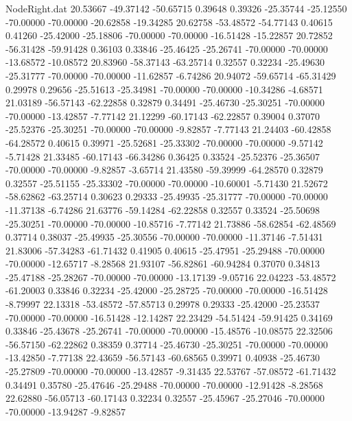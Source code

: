 \begin{filecontents}{NodeRight.dat}
  20.53667  -49.37142  -50.65715     0.39648    0.39326  -25.35744  -25.12550  -70.00000  -70.00000  -20.62858  -19.34285
  20.62758  -53.48572  -54.77143     0.40615    0.41260  -25.42000  -25.18806  -70.00000  -70.00000  -16.51428  -15.22857
  20.72852  -56.31428  -59.91428     0.36103    0.33846  -25.46425  -25.26741  -70.00000  -70.00000  -13.68572  -10.08572
  20.83960  -58.37143  -63.25714     0.32557    0.32234  -25.49630  -25.31777  -70.00000  -70.00000  -11.62857   -6.74286
  20.94072  -59.65714  -65.31429     0.29978    0.29656  -25.51613  -25.34981  -70.00000  -70.00000  -10.34286   -4.68571
  21.03189  -56.57143  -62.22858     0.32879    0.34491  -25.46730  -25.30251  -70.00000  -70.00000  -13.42857   -7.77142
  21.12299  -60.17143  -62.22857     0.39004    0.37070  -25.52376  -25.30251  -70.00000  -70.00000   -9.82857   -7.77143
  21.24403  -60.42858  -64.28572     0.40615    0.39971  -25.52681  -25.33302  -70.00000  -70.00000   -9.57142   -5.71428
  21.33485  -60.17143  -66.34286     0.36425    0.33524  -25.52376  -25.36507  -70.00000  -70.00000   -9.82857   -3.65714
  21.43580  -59.39999  -64.28570     0.32879    0.32557  -25.51155  -25.33302  -70.00000  -70.00000  -10.60001   -5.71430
  21.52672  -58.62862  -63.25714     0.30623    0.29333  -25.49935  -25.31777  -70.00000  -70.00000  -11.37138   -6.74286
  21.63776  -59.14284  -62.22858     0.32557    0.33524  -25.50698  -25.30251  -70.00000  -70.00000  -10.85716   -7.77142
  21.73886  -58.62854  -62.48569     0.37714    0.38037  -25.49935  -25.30556  -70.00000  -70.00000  -11.37146   -7.51431
  21.83006  -57.34283  -61.71432     0.41905    0.40615  -25.47951  -25.29488  -70.00000  -70.00000  -12.65717   -8.28568
  21.93107  -56.82861  -60.94284     0.37070    0.34813  -25.47188  -25.28267  -70.00000  -70.00000  -13.17139   -9.05716
  22.04223  -53.48572  -61.20003     0.33846    0.32234  -25.42000  -25.28725  -70.00000  -70.00000  -16.51428   -8.79997
  22.13318  -53.48572  -57.85713     0.29978    0.29333  -25.42000  -25.23537  -70.00000  -70.00000  -16.51428  -12.14287
  22.23429  -54.51424  -59.91425     0.34169    0.33846  -25.43678  -25.26741  -70.00000  -70.00000  -15.48576  -10.08575
  22.32506  -56.57150  -62.22862     0.38359    0.37714  -25.46730  -25.30251  -70.00000  -70.00000  -13.42850   -7.77138
  22.43659  -56.57143  -60.68565     0.39971    0.40938  -25.46730  -25.27809  -70.00000  -70.00000  -13.42857   -9.31435
  22.53767  -57.08572  -61.71432     0.34491    0.35780  -25.47646  -25.29488  -70.00000  -70.00000  -12.91428   -8.28568
  22.62880  -56.05713  -60.17143     0.32234    0.32557  -25.45967  -25.27046  -70.00000  -70.00000  -13.94287   -9.82857

\end{filecontents}
